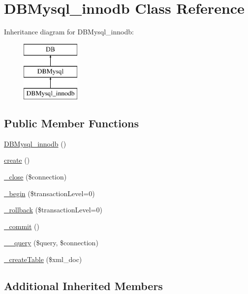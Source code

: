 \hypertarget{classDBMysql__innodb}{}\section{D\+B\+Mysql\+\_\+innodb Class Reference}
\label{classDBMysql__innodb}
Inheritance diagram for D\+B\+Mysql\+\_\+innodb\+:\begin{figure}[H]
\begin{center}
\leavevmode
\includegraphics[height=3.000000cm]{classDBMysql__innodb}
\end{center}
\end{figure}
\subsection*{Public Member Functions}
\begin{DoxyCompactItemize}
\item 
\hyperlink{classDBMysql__innodb_ad56600e5cbe42a0b26f40c2fd34dd4ea}{D\+B\+Mysql\+\_\+innodb} ()
\item 
\hyperlink{classDBMysql__innodb_ac00d0e52855fb50fc453dd78367de102}{create} ()
\item 
\hyperlink{classDBMysql__innodb_a006f982aef8b7fd2909d3912e0afb032}{\+\_\+close} (\$connection)
\item 
\hyperlink{classDBMysql__innodb_a12c61046869744bc9df72753d6ca8348}{\+\_\+begin} (\$transaction\+Level=0)
\item 
\hyperlink{classDBMysql__innodb_a36779df768253f967560eee5a8c1ae89}{\+\_\+rollback} (\$transaction\+Level=0)
\item 
\hyperlink{classDBMysql__innodb_a9ffbd5a0d262ae7dd7fb840822a7e543}{\+\_\+commit} ()
\item 
\hyperlink{classDBMysql__innodb_a12af9ec87d5f630d282c2bc2571ee5fe}{\+\_\+\+\_\+query} (\$query, \$connection)
\item 
\hyperlink{classDBMysql__innodb_aa2b634992fbfaaadea5c897b8810b87c}{\+\_\+create\+Table} (\$xml\+\_\+doc)
\end{DoxyCompactItemize}
\subsection*{Additional Inherited Members}


